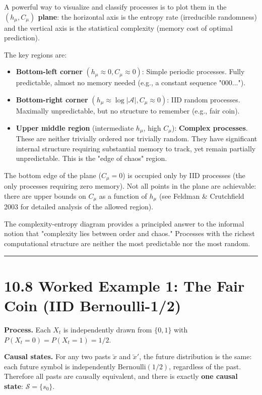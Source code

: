 A powerful way to visualize and classify processes is to plot them in the \textbf{$(h_\mu, C_\mu)$ plane}: the horizontal axis is the entropy rate (irreducible randomness) and the vertical axis is the statistical complexity (memory cost of optimal prediction).

The key regions are:

\begin{itemize}
  \item \textbf{Bottom-left corner} $(h_\mu \approx 0, C_\mu \approx 0)$: Simple periodic processes. Fully predictable, almost no memory needed (e.g., a constant sequence "000...").
  \item \textbf{Bottom-right corner} $(h_\mu \approx \log |\mathcal{A}|, C_\mu \approx 0)$: IID random processes. Maximally unpredictable, but no structure to remember (e.g., fair coin).
  \item \textbf{Upper middle region} (intermediate $h_\mu$, high $C_\mu$): \textbf{Complex processes}. These are neither trivially ordered nor trivially random. They have significant internal structure requiring substantial memory to track, yet remain partially unpredictable. This is the "edge of chaos" region.
\end{itemize}

The bottom edge of the plane ($C_\mu = 0$) is occupied only by IID processes (the only processes requiring zero memory). Not all points in the plane are achievable: there are upper bounds on $C_\mu$ as a function of $h_\mu$ (see Feldman & Crutchfield 2003 for detailed analysis of the allowed region).

The complexity-entropy diagram provides a principled answer to the informal notion that "complexity lies between order and chaos." Processes with the richest computational structure are neither the most predictable nor the most random.

\bigskip\hrule\bigskip

\section{10.8 Worked Example 1: The Fair Coin (IID Bernoulli-1/2)}

\textbf{Process.} Each $X_t$ is independently drawn from $\{ 0, 1\} $ with $P(X_t = 0) = P(X_t = 1) = 1/2$.

\textbf{Causal states.} For any two pasts $\overleftarrow{x}$ and $\overleftarrow{x}'$, the future distribution is the same: each future symbol is independently $\text{Bernoulli}(1/2)$, regardless of the past. Therefore all pasts are causally equivalent, and there is exactly \textbf{one causal state}: $\mathcal{S} = \{ s_0\} $.

